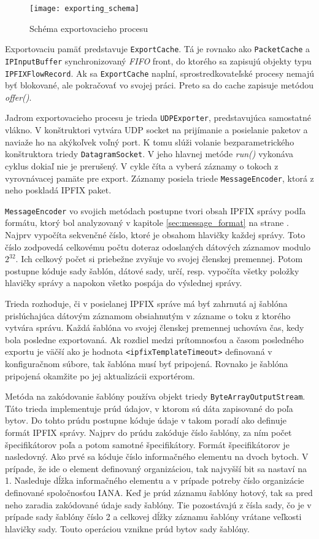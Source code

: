 \begin{figure}[ht!]
\centering
\texttt{[image: exporting\_schema]}
\caption{Schéma exportovacieho procesu}\label{o:exporting_schema}
\end{figure}

Exportovaciu pamäť predstavuje \verb|ExportCache|. Tá je rovnako ako \verb|PacketCache| a 
\verb|IPInputBuffer| synchronizovaný \emph{FIFO} front, do ktorého sa zapisujú objekty typu 
\verb|IPFIXFlowRecord|. Ak sa \verb|ExportCache| naplní, sprostredkovateľské procesy nemajú byť blokované, 
ale pokračovať vo svojej práci. Preto sa do cache zapisuje metódou \emph{offer()}.

Jadrom exportovacieho procesu je trieda \verb|UDPExporter|, predstavujúca samostatné vlákno. V 
konštruktori vytvára UDP socket na prijímanie a posielanie paketov a naviaže ho na akýkoľvek voľný port.
K tomu slúži volanie bezparametrického konštruktora triedy \verb|DatagramSocket|. V jeho hlavnej metóde 
\emph{run()} vykonáva cyklus dokiaľ nie je prerušený. V cykle číta a vyberá záznamy o tokoch z 
vyrovnávacej pamäte pre export. Záznamy posiela triede \verb|MessageEncoder|, ktorá z neho poskladá 
IPFIX paket.

\verb|MessageEncoder| vo svojich metódach postupne tvori obsah IPFIX správy podľa formátu, ktorý bol 
analyzovaný v kapitole \ref{sec:message_format} na strane \pageref{sec:message_format}. Najprv vypočíta 
sekvenčné číslo, ktoré je obsahom hlavičky každej správy. Toto číslo zodpovedá celkovému počtu doteraz 
odoslaných dátových záznamov modulo $2^{32}$. Ich celkový počet si priebežne zvyšuje vo svojej členskej 
premennej. Potom postupne kóduje sady šablón, dátové sady, určí, resp. vypočíta všetky položky 
hlavičky správy a napokon všetko pospája do výslednej správy.

Trieda rozhoduje, či v posielanej IPFIX správe má byť zahrnutá aj šablóna prislúchajúca dátovým záznamom
obsiahnutým v zázname o toku z ktorého vytvára správu. Každá šablóna vo svojej členskej premennej uchováva
čas, kedy bola posledne exportovaná. Ak rozdiel medzi prítomnosťou a časom posledného exportu je väčší ako 
je hodnota \verb|<ipfixTemplateTimeout>| definovaná v konfiguračnom súbore, tak šablóna musí byť pripojená.
Rovnako je šablóna pripojená okamžite po jej aktualizácii exportérom. 

Metóda na zakódovanie šablóny používa objekt triedy \verb|ByteArrayOutputStream|. Táto trieda 
implementuje prúd údajov, v ktorom sú dáta zapisované do poľa bytov. Do tohto prúdu postupne kóduje údaje 
v takom poradí ako definuje formát IPFIX správy. Najprv do prúdu zakóduje číslo šablóny, za ním 
počet špecifikátorov poľa a potom samotné špecifikátory. Formát špecifikátorov je nasledovný. Ako prvé sa 
kóduje číslo informačného elementu na dvoch bytoch. V prípade, že ide o element definovaný 
organizáciou, tak najvyšší bit sa nastaví na 1. Nasleduje dĺžka informačného elementu a v prípade potreby 
číslo organizácie definované spoločnosťou IANA. Keď je prúd záznamu šablóny hotový, tak sa pred neho 
zaradia zakódované údaje sady šablóny. Tie pozostávajú z čísla sady, čo je v prípade sady šablóny číslo 2
a celkovej dĺžky záznamu šablóny 
vrátane veľkosti hlavičky sady. Touto operáciou vznikne prúd bytov sady šablóny.


